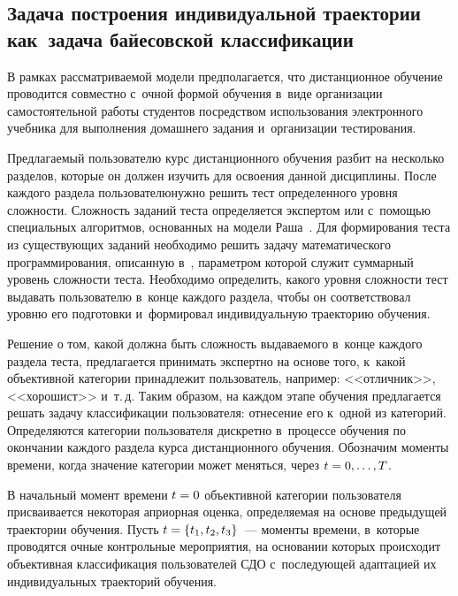 \begin{multicols}{2}
\vspace*{-6pt}

\section{Задача построения индивидуальной траектории как~задача байесовской 
классификации}

\vspace*{-2pt}

      В рамках рассматриваемой модели предполагается, что дистанционное обучение 
проводится совместно с~очной формой обучения в~виде организации самостоятельной 
работы студентов посредством использования электронного учебника для выполнения 
домашнего задания и~организации тестирования.
      
      Предлагаемый пользователю курс дистанционного обучения разбит на несколько 
разделов, которые он должен изучить для освоения данной дис\-циплины. После каждого 
раздела пользователю\linebreak нужно решить тест определенного уровня слож\-ности. Сложность 
заданий теста определяется экспертом или с~по\-мощью специальных алгоритмов, 
основанных на модели Раша~\cite{2-bos}. Для формирования теста из существующих 
заданий необходимо решить задачу математического программирования, описанную 
в~\cite{14-bos}, параметром которой служит суммарный уровень сложности теста.  
Необходимо определить, какого уровня сложности тест выдавать пользователю в~конце 
каждого раздела, чтобы он соответствовал уровню его подготовки и~формировал 
индивидуальную траекторию обучения.
      
      Решение о том, какой должна быть сложность выдаваемого в~конце каждого 
раздела теста, предлагается принимать экспертно на основе того, к~какой объективной 
категории принадлежит пользователь, например: <<отличник>>, <<хорошист>> и~т.\,д. 
Таким образом, на каждом этапе обучения предлагается решать задачу классификации 
пользователя: отнесение его к~одной из категорий. Определяются категории пользователя 
дискретно в~процессе обуче\-ния по окончании каждого раздела курса дис\-тан\-ци\-он\-но\-го 
обучения. Обозначим моменты времени, когда значение категории может меняться, через 
$t\hm= 0, \ldots ,T$.
      
      В начальный момент времени $t\hm=0$  объ\-ек\-тивной  категории пользователя 
присваивается\linebreak
 некоторая априорная оценка, опре\-де\-ля\-емая на основе предыду\-щей 
траектории обучения. Пусть $t\hm= \{t_1, t_2, t_3\}$~--- моменты времени, 
в~которые\linebreak 
проводятся очные контрольные мероприятия, на основании которых происходит 
объективная клас\-си\-фикация пользователей СДО с~последующей адап\-та\-ци\-ей их 
индивидуальных траекторий обучения.
      

\end{multicols}
